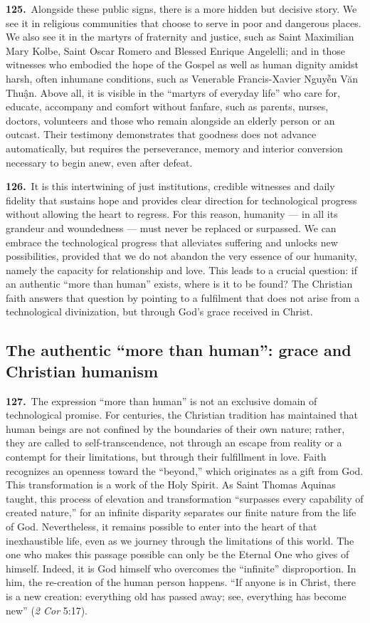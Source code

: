 \documentclass{article}
\begin{document}
\textbf{125.}\ Alongside these public signs, there is a more hidden but decisive story. We see it in religious communities that choose to serve in poor and dangerous places. We also see it in the martyrs of fraternity and justice, such as Saint Maximilian Mary Kolbe, Saint Oscar Romero and Blessed Enrique Angelelli; and in those witnesses who embodied the hope of the Gospel as well as human dignity amidst harsh, often inhumane conditions, such as Venerable Francis-Xavier Nguyễn Văn Thuận. Above all, it is visible in the ``martyrs of everyday life'' who care for, educate, accompany and comfort without fanfare, such as parents, nurses, doctors, volunteers and those who remain alongside an elderly person or an outcast. Their testimony demonstrates that goodness does not advance automatically, but requires the perseverance, memory and interior conversion necessary to begin anew, even after defeat.

\textbf{126.}\ It is this intertwining of just institutions, credible witnesses and daily fidelity that sustains hope and provides clear direction for technological progress without allowing the heart to regress. For this reason, humanity --- in all its grandeur and woundedness --- must never be replaced or surpassed. We can embrace the technological progress that alleviates suffering and unlocks new possibilities, provided that we do not abandon the very essence of our humanity, namely the capacity for relationship and love. This leads to a crucial question: if an authentic ``more than human'' exists, where is it to be found? The Christian faith answers that question by pointing to a fulfilment that does not arise from a technological divinization, but through God's grace received in Christ.

\subsection{The authentic ``more than human'': grace and Christian humanism}

\textbf{127.}\ The expression ``more than human'' is not an exclusive domain of technological promise. For centuries, the Christian tradition has maintained that human beings are not confined by the boundaries of their own nature; rather, they are called to self-transcendence, not through an escape from reality or a contempt for their limitations, but through their fulfillment in love. Faith recognizes an openness toward the ``beyond,'' which originates as a gift from God. This transformation is a work of the Holy Spirit. As Saint Thomas Aquinas taught, this process of elevation and transformation ``surpasses every capability of created nature,''\cite{n134} for an infinite disparity separates our finite nature from the life of God.\cite{n135} Nevertheless, it remains possible to enter into the heart of that inexhaustible life, even as we journey through the limitations of this world. The one who makes this passage possible can only be the Eternal One who gives of himself. Indeed, it is God himself who overcomes the ``infinite'' disproportion.\cite{n136} In him, the re-creation of the human person happens. ``If anyone is in Christ, there is a new creation: everything old has passed away; see, everything has become new'' (\emph{2 Cor} 5:17).
\end{document}

